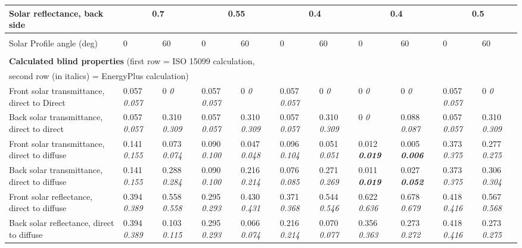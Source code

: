 \begin{longtable}[c]{p{1.0in}p{0.4in}p{0.4in}p{0.4in}p{0.4in}p{0.4in}p{0.4in}p{0.4in}p{0.4in}p{0.4in}p{0.4in}}
Solar reflectance, back side & \multicolumn{2}{c}{0.7} & \multicolumn{2}{c}{0.55} & \multicolumn{2}{c}{0.4} & \multicolumn{2}{c}{0.4} & \multicolumn{2}{c}{0.5} \tabularnewline \midrule
 \tabularnewline \midrule
Solar Profile angle (deg) & 0 & 60 & 0 & 60 & 0 & 60 & 0 & 60 & 0 & 60 \tabularnewline \midrule
 \tabularnewline \midrule
\multicolumn{11}{l}{\textbf{Calculated blind properties} (first row = ISO 15099 calculation,} \tabularnewline
\multicolumn{11}{l}{second row (in italics) = EnergyPlus calculation)} \tabularnewline \midrule
Front solar transmittance, direct to Direct & 0.057 \quad \quad \textit{0.057} & 0 \quad \quad \textit{0} & 0.057 \quad \quad \textit{0.057} & 0 \quad \quad \textit{0} & 0.057 \quad \quad \textit{0.057} & 0 \quad \quad \textit{0} & 0 \quad \quad \textit{0} & 0 \quad \quad \textit{0} & 0.057 \quad \quad \textit{0.057} & 0 \quad \quad \textit{0} \tabularnewline
Back solar transmittance, direct to direct & 0.057 \quad \quad \textit{0.057} & 0.310 \quad \quad \textit{0.309} & 0.057 \quad \quad \textit{0.057} & 0.310 \quad \quad \textit{0.309} & 0.057 \quad \quad \textit{0.057} & 0.310 \quad \quad \textit{0.309} & 0 \quad \quad \textit{0} & 0.088 \quad \quad \textit{0.087} & 0.057 \quad \quad \textit{0.057} & 0.310 \quad \quad \textit{0.309} \tabularnewline
Front solar transmittance, direct to diffuse & 0.141 \quad \quad \textit{0.155} & 0.073 \quad \quad \textit{0.074} & 0.090 \quad \quad \textit{0.100} & 0.047 \quad \quad \textit{0.048} & 0.096 \quad \quad \textit{0.104} & 0.051 \quad \quad \textit{0.051} & 0.012 \quad \quad \textbf{\textit{0.019}} & 0.005 \quad \quad \textbf{\textit{0.006}} & 0.373 \quad \quad \textit{0.375} & 0.277 \quad \quad \textit{0.275} \tabularnewline
Back solar transmittance, direct to diffuse & 0.141 \quad \quad \textit{0.155} & 0.288 \quad \quad \textit{0.284} & 0.090 \quad \quad \textit{0.100} & 0.216 \quad \quad \textit{0.214} & 0.076 \quad \quad \textit{0.085} & 0.271 \quad \quad \textit{0.269} & 0.011 \quad \quad \textbf{\textit{0.019}} & 0.027 \quad \quad \textbf{\textit{0.052}} & 0.373 \quad \quad \textit{0.375} & 0.306 \quad \quad \textit{0.304} \tabularnewline
Front solar reflectance, direct to diffuse & 0.394 \quad \quad \textit{0.389} & 0.558 \quad \quad \textit{0.558} & 0.295 \quad \quad \textit{0.293} & 0.430 \quad \quad \textit{0.431} & 0.371 \quad \quad \textit{0.368} & 0.544 \quad \quad \textit{0.546} & 0.622 \quad \quad \textit{0.636} & 0.678 \quad \quad \textit{0.679} & 0.418 \quad \quad \textit{0.416} & 0.567 \quad \quad \textit{0.568} \tabularnewline
Back solar reflectance, direct to diffuse & 0.394 \quad \quad \textit{0.389} & 0.103 \quad \quad \textit{0.115} & 0.295 \quad \quad \textit{0.293} & 0.066 \quad \quad \textit{0.074} & 0.216 \quad \quad \textit{0.214} & 0.070 \quad \quad \textit{0.077} & 0.356 \quad \quad \textit{0.363} & 0.273 \quad \quad \textit{0.272} & 0.418 \quad \quad \textit{0.416} & 0.273 \quad \quad \textit{0.275} \tabularnewline

\end{longtable}
